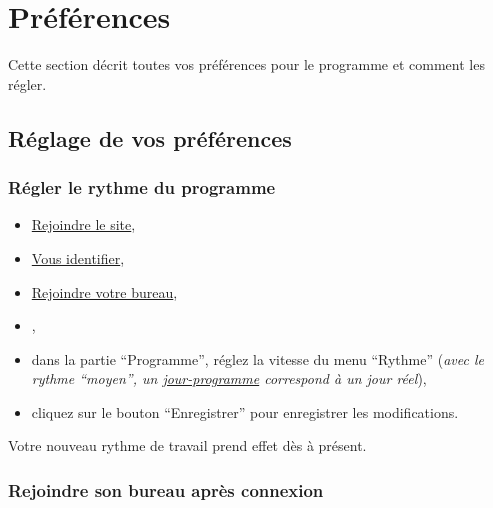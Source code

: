 % 
% 
% 
% 
% 
% 
% 
% 

\chapter{Préférences}\hypertarget{preferences-auteur}{}\label{preferences-auteur}

Cette section décrit toutes vos préférences pour le programme \unan{} et comment les régler.

\section{Réglage de vos préférences}\hypertarget{reglage-preferences}{}\label{reglage-preferences}

\subsection{Régler le rythme du programme}\hypertarget{regler-rythme}{}\label{regler-rythme}

\begin{itemize}
\item \hyperlink{rejoindre-site}{Rejoindre le site},
\item \hyperlink{vous-identifier}{Vous identifier},
\item \hyperlink{rejoindre-bureau}{Rejoindre votre bureau},
\item {},
\item dans la partie “Programme”, réglez la vitesse du menu “Rythme” (\emph{avec le rythme ``moyen'', un \hyperlink{explicationjourprogrammejourreel}{jour-programme} correspond à un jour réel}),
\item cliquez sur le bouton “Enregistrer'' pour enregistrer les modifications.
\end{itemize}

Votre nouveau rythme de travail prend effet dès à présent.

\subsection{Rejoindre son bureau après connexion}\hypertarget{rejoindre-bureau-apres-connexion}{}\label{rejoindre-bureau-apres-connexion}

